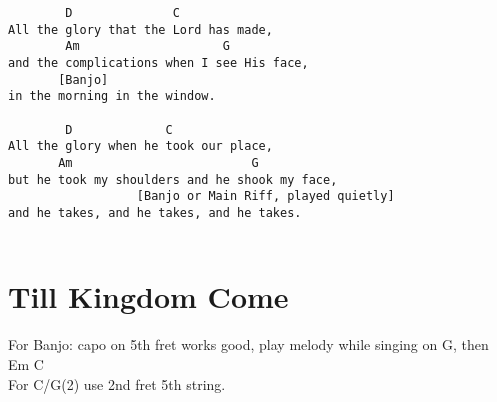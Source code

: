 \documentclass[leqno]{memoir}
\begin{document}
\newpage
\begin{verbatim}
        D              C
All the glory that the Lord has made,
        Am                    G
and the complications when I see His face,
       [Banjo]
in the morning in the window.

        D             C
All the glory when he took our place,
       Am                         G
but he took my shoulders and he shook my face,
                  [Banjo or Main Riff, played quietly]
and he takes, and he takes, and he takes.


\end{verbatim}
\newpage

\chapter{Till Kingdom Come}
For Banjo: capo on 5th fret works good, play melody while singing on G, then Em C\\
For C/G(2) use 2nd fret 5th string.
\end{document}
